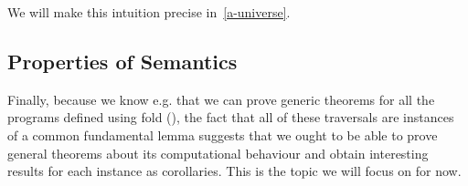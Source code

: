 We will make this intuition precise in~\cref{a-universe}.

\subsection{Properties of Semantics}

Finally, because we know e.g. that we can prove generic theorems for all the
programs defined using fold (\cite{DBLP:journals/scp/Malcolm90}), the fact
that all of these traversals are instances of a common fundamental lemma
suggests that we ought to be able to prove general theorems about its
computational behaviour and obtain interesting results for each instance
as corollaries. This is the topic we will focus on for now.
